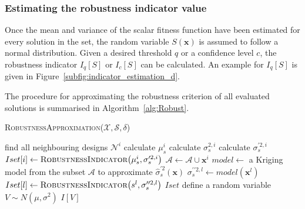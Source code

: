 \documentclass[a4paper]{article}
\newcommand{\brr}[1]{{\left({#1}\right)}} %
\newcommand{\brabs}[1]{\left\vert{#1}\right\vert} %
\newcommand{\I}[1]{\ensuremath{I\!\left[{#1}\right]}} %
\newcommand{\Iq}[1]{\ensuremath{I_q\!\left[{#1}\right]}} %
\newcommand{\Ic}[1]{\ensuremath{I_c\!\left[{#1}\right]}} %
\newcommand{\vx}{\ensuremath{\mathbf{x}}} %
\newcommand{\NSet}{\ensuremath{\mathcal{N}}} %
\newcommand{\XSet}{\ensuremath{\mathcal{X}}} %
\newcommand{\SSet}{\ensuremath{\mathcal{S}}} %
\begin{document}
\subsubsection{Estimating the robustness indicator value}
\label{subsubsec:robustness indicators}
Once the mean and variance of the scalar fitness function have been estimated for every solution in the set, the random variable $S\brr{\vx}$ is assumed to follow a normal distribution. Given a desired threshold $q$ or a confidence level $c$,  the robustness indicator $\Iq{S}$ or $\Ic{S}$ can be calculated. An example for $\Iq{S}$ is given in Figure~\ref{subfig:indicator_estimation_d}.

The procedure for approximating the robustness criterion of all evaluated solutions is summarised in Algorithm~\ref{alg:Robust}.

\begin{algorithm}
\caption{\textsc{RobustnessApproximation($\XSet,\SSet,\delta$)}}
\label{alg:Robust}
\begin{algorithmic}[1]
	\ForAll{$\vx^i\in \XSet$}
		\State find all neighbouring designs $ \NSet^i$ 
		\If{$\brabs{ \NSet^i} > 1$}
			\State calculate $\mu_s^i$ 
			\State calculate $\sigma_s^{2,i}$ 
			\State calculate $\sigma_s^{\prime 2,i}$ 
			\State $Iset[i] \leftarrow \textsc{RobustnessIndicator}\brr{\mu_s^i,\sigma_s^{\prime 2,i}}$ 
			\State $\mathcal{A} \leftarrow \mathcal{A} \cup \vx^i$
		\EndIf
	\EndFor
	\State $model \leftarrow$ a Kriging model from the subset $\mathcal{A}$ to approximate $\hat{\sigma}^{\prime 2}_s\brr{\vx}$
	\ForAll{$\vx^l\in \XSet \setminus\mathcal{A}$}
		\State $\sigma_s^{\prime\prime 2,l} \leftarrow model\brr{\vx^l}$
		\State $Iset[l] \leftarrow \textsc{RobustnessIndicator}\brr{s^l,\sigma_s^{\prime\prime 2,l}}$ 
	\EndFor
	\State \Return $Iset$
	\Statex
	\label{line:Robustness Ind}
		\State define a random variable $V\sim N\brr{\mu,\sigma^2}$
		\State \Return \I{V} 
	\EndProcedure
\end{algorithmic}
\end{algorithm}
\end{document}
